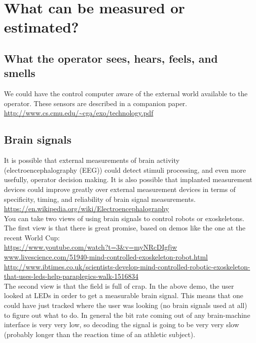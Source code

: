 \documentclass[letterpaper,12pt,fullpage]{article}
\begin{document}
\section{What can be measured or estimated?}

\subsection{What the operator sees, hears, feels, and smells}

We could have the control computer aware of the external world
available to the operator. These sensors are described in
a companion paper.\\
\url{http://www.cs.cmu.edu/~cga/exo/technology.pdf}

\subsection{Brain signals}

It is possible that external measurements of brain activity
(electroencephalography (EEG)) could detect stimuli processing, and
even more usefully, operator decision making.
It is also possible that implanted measurement devices could improve
greatly over external measurement devices in terms of specificity,
timing, and reliability of brain signal measurements.\\
\url{https://en.wikipedia.org/wiki/Electroencephalography}\\

You can take two views of using brain signals to control robots or
exoskeletons.
The first view is that there is great promise, based on demos like
the one at the recent World Cup:\\
\url{https://www.youtube.com/watch?t=3&v=myNRcDIgfjw}\\
\url{www.livescience.com/51940-mind-controlled-exoskeleton-robot.html}\\
\url{http://www.ibtimes.co.uk/scientists-develop-mind-controlled-robotic-exoskeleton-that-uses-leds-help-paraplegics-walk-1516834}\\

The second view is that the field is full of crap. In the above demo,
the user looked at LEDs in order to get a measurable brain signal.
This means that one could have just tracked where the user was looking
(no brain signals used at all) to figure out what to do.
In general the bit rate coming out of any brain-machine interface is
very very low, so decoding the signal is going to be very very slow
(probably longer than the reaction time of an athletic subject).
\end{document}
